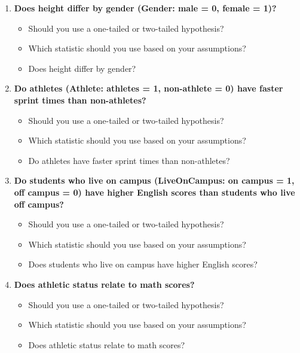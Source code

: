 \documentclass[
]{book}
\begin{document}
\begin{enumerate}
\def\labelenumi{\arabic{enumi}.}
\item
  \textbf{Does height differ by gender (Gender: male = 0, female = 1)?}

  \begin{itemize}
  \item
    Should you use a one-tailed or two-tailed hypothesis?
  \item
    Which statistic should you use based on your assumptions?
  \item
    Does height differ by gender?
  \end{itemize}
\item
  \textbf{Do athletes (Athlete: athletes = 1, non-athlete = 0) have faster sprint times than non-athletes?}

  \begin{itemize}
  \item
    Should you use a one-tailed or two-tailed hypothesis?
  \item
    Which statistic should you use based on your assumptions?
  \item
    Do athletes have faster sprint times than non-athletes?
  \end{itemize}
\item
  \textbf{Do students who live on campus (LiveOnCampus: on campus = 1, off campus = 0) have higher English scores than students who live off campus?}

  \begin{itemize}
  \item
    Should you use a one-tailed or two-tailed hypothesis?
  \item
    Which statistic should you use based on your assumptions?
  \item
    Does students who live on campus have higher English scores?
  \end{itemize}
\item
  \textbf{Does athletic status relate to math scores?}

  \begin{itemize}
  \item
    Should you use a one-tailed or two-tailed hypothesis?
  \item
    Which statistic should you use based on your assumptions?
  \item
    Does athletic status relate to math scores?
  \end{itemize}
\end{enumerate}
\end{document}
